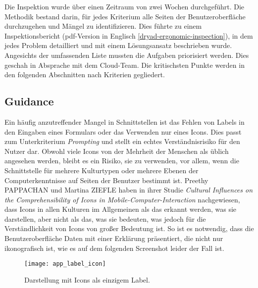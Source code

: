 
Die Inspektion wurde über einen Zeitraum von zwei Wochen durchgeführt. Die Methodik bestand darin, für jedes Kriterium alle Seiten der Benutzeroberfläche durchzugehen und Mängel zu identifizieren.
Dies führte zu einem Inspektionsbericht (pdf-Version in Englisch \ref{dryad-ergonomic-inspection}), in dem jedes Problem detailliert und mit einem Lösungsansatz beschrieben wurde. Angesichts der umfassenden Liste mussten die Aufgaben priorisiert werden.
Dies geschah in Absprache mit dem Cloud-Team.
Die kritischsten Punkte werden in den folgenden Abschnitten nach Kriterien gegliedert.

\subsection{Guidance}

Ein häufig anzutreffender Mangel in Schnittstellen ist das Fehlen von Labels in den Eingaben eines Formulars oder das Verwenden nur eines Icons.
Dies passt zum Unterkriterium \textit{Prompting} und stellt ein echtes Verständnisrisiko für den Nutzer dar.
Obwohl viele Icons von der Mehrheit der Menschen als üblich angesehen werden, bleibt es ein Risiko, sie zu verwenden, vor allem, wenn die Schnittstelle für mehrere Kulturtypen oder mehrere Ebenen der Computerkenntnisse auf Seiten der Benutzer bestimmt ist.
Preethy PAPPACHAN und Martina ZIEFLE haben in ihrer Studie \textit{Cultural Influences on the Comprehensibility of Icons in Mobile-Computer-Interaction}\cite{iconsCultureInfluence} nachgewiesen, dass Icons in allen Kulturen im Allgemeinen als das erkannt werden, was sie darstellen, aber nicht als das, was sie bedeuten, was jedoch für die Verständlichkeit von Icons von großer Bedeutung ist.
So ist es notwendig, dass die Benutzeroberfläche Daten mit einer Erklärung präsentiert, die nicht nur ikonografisch ist, wie es auf dem folgenden Screenshot leider der Fall ist.

\begin{figure}[H]
  \centering
  \texttt{[image: app\_label\_icon]}
  \caption{Darstellung mit Icons als einzigem Label.}
\end{figure}

